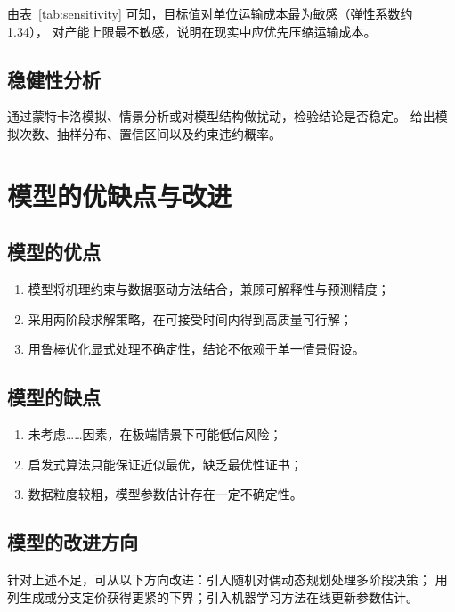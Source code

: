\documentclass[12pt,a4paper]{ctexart}
\begin{document}
由表~\ref{tab:sensitivity} 可知，目标值对单位运输成本最为敏感（弹性系数约 1.34），
对产能上限最不敏感，说明在现实中应优先压缩运输成本。

\subsection{稳健性分析}

通过蒙特卡洛模拟、情景分析或对模型结构做扰动，检验结论是否稳定。
给出模拟次数、抽样分布、置信区间以及约束违约概率。

\section{模型的优缺点与改进}
\label{sec:proscons}

\subsection{模型的优点}

\begin{enumerate}
  \item 模型将机理约束与数据驱动方法结合，兼顾可解释性与预测精度；
  \item 采用两阶段求解策略，在可接受时间内得到高质量可行解；
  \item 用鲁棒优化显式处理不确定性，结论不依赖于单一情景假设。
\end{enumerate}

\subsection{模型的缺点}

\begin{enumerate}
  \item 未考虑……因素，在极端情景下可能低估风险；
  \item 启发式算法只能保证近似最优，缺乏最优性证书；
  \item 数据粒度较粗，模型参数估计存在一定不确定性。
\end{enumerate}

\subsection{模型的改进方向}

针对上述不足，可从以下方向改进：引入随机对偶动态规划处理多阶段决策；
用列生成或分支定价获得更紧的下界；引入机器学习方法在线更新参数估计。

\newpage
\end{document}
